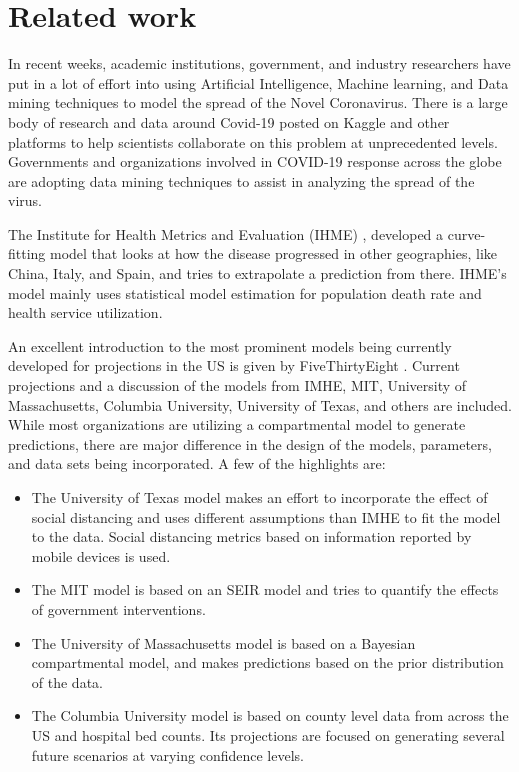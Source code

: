 \documentclass[11pt]{article}
\begin{document}
\section{Related work}
In recent weeks, academic institutions, government, and industry researchers have put in a lot of effort into using Artificial Intelligence, Machine learning, and Data mining techniques to model the spread of the Novel Coronavirus. There is a large body of research and data around Covid-19 posted on Kaggle and other platforms to help scientists collaborate on this problem at unprecedented levels. Governments and organizations involved in COVID-19 response across the globe are adopting data mining techniques to assist in analyzing the spread of the virus.

The Institute for Health Metrics and Evaluation (IHME) \cite{ihme}, developed a curve-fitting model that looks at how the disease progressed in other geographies, like China, Italy, and Spain, and tries to extrapolate a prediction from there. IHME’s model mainly uses statistical model estimation for population death rate and health service utilization. 

An excellent introduction to the most prominent models being currently developed for projections in the US is given by FiveThirtyEight \cite{latest-models}. Current projections and a discussion of the models from IMHE, MIT, University of Massachusetts, Columbia University, University of Texas, and others are included. While most organizations are utilizing a compartmental model to generate predictions, there are major difference in the design of the models, parameters, and data sets being incorporated. A few of the highlights are:
\begin{itemize}
    \item The University of Texas model makes an effort to incorporate the effect of social distancing and uses different assumptions than IMHE to fit the model to the data. Social distancing metrics based on information reported by mobile devices is used.
    \item The MIT model is based on an SEIR model and tries to quantify the effects of government interventions.
    \item The University of Massachusetts model is based on a Bayesian compartmental model, and makes predictions based on the prior distribution of the data.
    \item The Columbia University model is based on county level data from across the US and hospital bed counts. Its projections are focused on generating several future scenarios at varying confidence levels.
\end{itemize}
\end{document}
